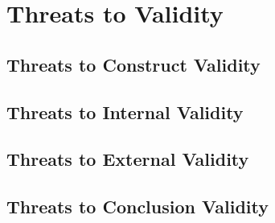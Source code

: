 \iffalse  \fi
\chapter{Threats to Validity}

\section{Threats to Construct Validity}
\section{Threats to Internal Validity}
\section{Threats to External Validity}
\section{Threats to Conclusion Validity}







% 


